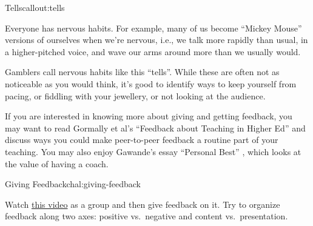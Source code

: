 \begin{callout}{Tells}{callout:tells}

Everyone has nervous habits. For example, many of us become ``Mickey
Mouse'' versions of ourselves when we're nervous, i.e., we talk more
rapidly than usual, in a higher-pitched voice, and wave our arms
around more than we usually would.

Gamblers call nervous habits like this ``tells''.  While these are
often not as noticeable as you would think, it's good to identify ways
to keep yourself from pacing, or fiddling with your jewellery, or not
looking at the audience.

\end{callout}

If you are interested in knowing more about giving and getting
feedback, you may want to read Gormally et al's ``Feedback about
Teaching in Higher Ed'' \cite{bib:gormally-teaching-feedback} and
discuss ways you could make peer-to-peer feedback a routine part of
your teaching.  You may also enjoy Gawande's essay ``Personal Best''
\cite{bib:gawande-personal-best}, which looks at the value of having a
coach.


\begin{challenge}{Giving Feedback}{chal:giving-feedback}

\begin{genumerate}

\item
  Watch \href{https://www.youtube.com/watch?v=-ApVt04rB4U}{this video}
  as a group and then give feedback on it. Try to organize feedback
  along two axes: positive vs.\ negative and content vs.\
  presentation.

\item

\end{genumerate}

\end{challenge}

